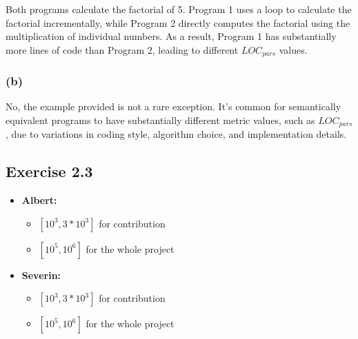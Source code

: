\documentclass[a4paper]{scrartcl}
\begin{document}
\subsubsection*{}
Both programs calculate the factorial of 5.
Program 1 uses a loop to calculate the factorial incrementally,
while Program 2 directly computes the factorial using the multiplication of individual numbers.
As a result, Program 1 has substantially more lines of code than Program 2, leading to different $LOC_{pars}$ values.

\subsubsection*{(b)}
No, the example provided is not a rare exception.
It's common for semantically equivalent programs to have substantially different metric values, such as $LOC_{pars}$,
due to variations in coding style, algorithm choice, and implementation details.

\subsection*{Exercise 2.3}

\begin{itemize}
  \item \textbf{Albert:}
        \begin{itemize}
          \item $[10^3, 3*10^3]$ for contribution 
          \item $[10^5, 10^6]$ for the whole project
        \end{itemize}

  \item \textbf{Severin:}
        \begin{itemize}
          \item $[10^3, 3*10^3]$ for contribution 
          \item $[10^5, 10^6]$ for the whole project
        \end{itemize}
\end{itemize}
\end{document}
